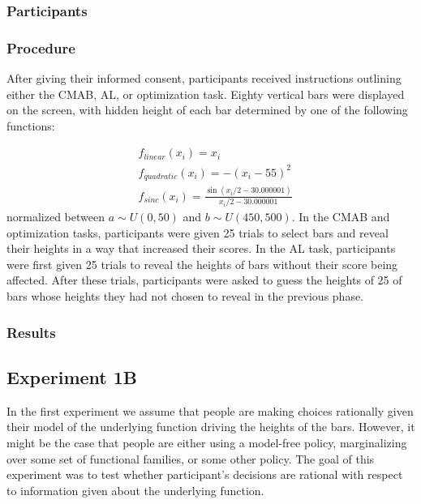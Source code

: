 \documentclass[10pt,letterpaper]{article}
\begin{document}
	
	\subsubsection{Participants}
	
	\subsubsection{Procedure}
	
	After giving their informed consent, participants received instructions outlining either the CMAB, AL, or optimization task. Eighty vertical bars were displayed on the screen, with hidden height of each bar determined by one of the following functions:
	
	\begin{equation}
	\begin{split}
	&f_{linear}(x_{i}) = x_{i} \\
	&f_{quadratic}(x_{i}) = -(x_{i}-55)^{2} \\
	&f_{sinc}(x_{i}) = \frac{\sin(x_{i}/2-30.000001)}{x_{i}/2-30.000001}
	\end{split}
	\end{equation}
	normalized between $a \sim U(0,50)$ and $b \sim U(450,500)$. In the CMAB and optimization tasks, participants were given 25 trials to select bars and reveal their heights in a way that increased their scores. In the AL task, participants were first given 25 trials to reveal the heights of bars without their score being affected. After these trials, participants were asked to guess the heights of 25 of bars whose heights they had not chosen to reveal in the previous phase.
	
	\subsubsection{Results}
	
	\subsection{Experiment 1B}
	
	In the first experiment we assume that people are making choices rationally given their model of the underlying function driving the heights of the bars. However, it might be the case that people are either using a model-free policy, marginalizing over some set of functional families, or some other policy. The goal of this experiment was to test whether participant's decisions are rational with respect to information given about the underlying function.
	
\end{document}
